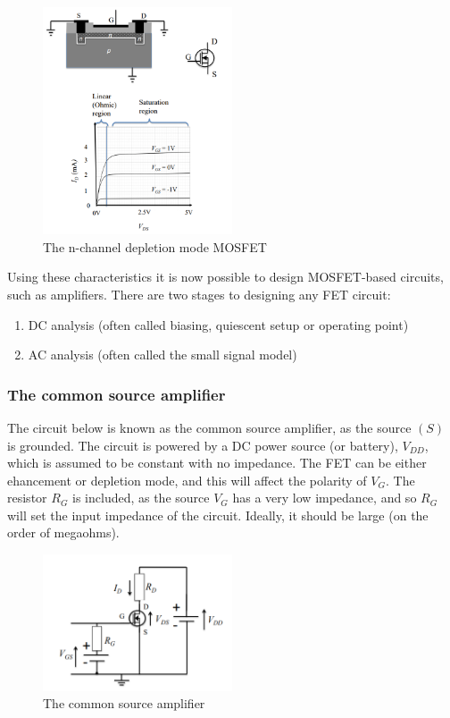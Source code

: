 \documentclass{article}
\begin{document}
\begin{figure}[h]
    \centering
    \includegraphics[width = 0.5\textwidth]{images/fet3.png}
    \caption{The n-channel depletion mode MOSFET}
    \label{fig:enter-label}
\end{figure}

Using these characteristics it is now possible to design MOSFET-based circuits, such as amplifiers. There are two stages to designing any FET circuit:

\begin{enumerate}
    \item DC analysis (often called biasing, quiescent setup or operating point)
    \item AC analysis (often called the small signal model)
\end{enumerate}

\subsubsection{The common source amplifier}

The circuit below is known as the common source amplifier, as the source $(S)$ is grounded. The circuit is powered by a DC power source (or battery), $V_{DD}$, which is assumed to be constant with no impedance. The FET can be either ehancement or depletion mode, and this will affect the polarity of $V_G$. The resistor $R_G$ is included, as the source $V_G$ has a very low impedance, and so $R_G$ will set the input impedance of the circuit. Ideally, it should be large (on the order of megaohms).

\newpage

\begin{figure}[h]
    \centering
    \includegraphics[width = 0.5\textwidth]{images/fet4.png}
    \caption{The common source amplifier}
    \label{fig:enter-label}
\end{figure}
\end{document}
